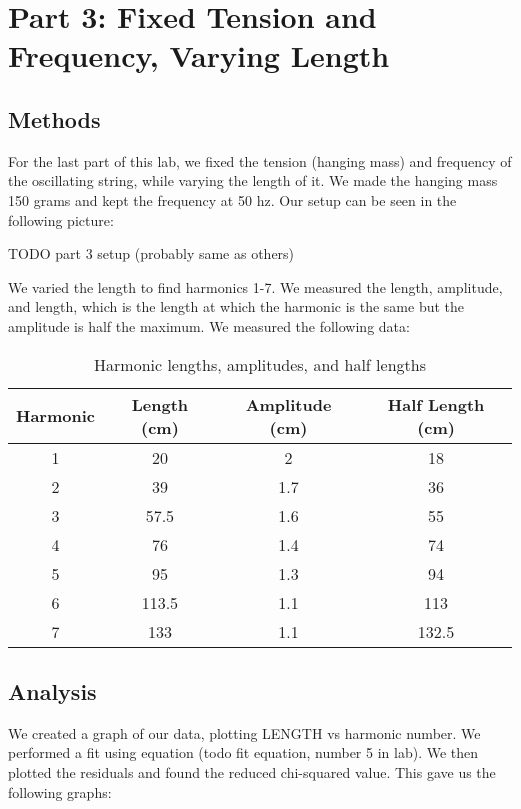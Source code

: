 \documentclass[11pt]{article}
\let\oldsection\section
\renewcommand\section{\clearpage\oldsection}
\begin{document}
    \section{Part 3: Fixed Tension and Frequency, Varying Length}\label{sec:part_3}
    \subsection{Methods}\label{subsec:part_3_methods}
    For the last part of this lab, we fixed the tension (hanging mass) and frequency of the oscillating string, while varying the length of it. We made the hanging mass 150 grams and kept the frequency at 50 hz. Our setup can be seen in the following picture:

    TODO part 3 setup (probably same as others)

    We varied the length to find harmonics 1-7. We measured the length, amplitude, and length, which is the length at which the harmonic is the same but the amplitude is half the maximum. We measured the following data:

    \begin{table}[h]
    \centering
    \begin{tabular}{|c|c|c|c|}
    \hline
    \textbf{Harmonic} & \textbf{Length (cm)} & \textbf{Amplitude (cm)} & \textbf{Half Length (cm)} \\
    \hline
    1 & 20 & 2 & 18 \\
    2 & 39 & 1.7 & 36 \\
    3 & 57.5 & 1.6 & 55 \\
    4 & 76 & 1.4 & 74 \\
    5 & 95 & 1.3 & 94 \\
    6 & 113.5 & 1.1 & 113 \\
    7 & 133 & 1.1 & 132.5 \\
    \hline
    \end{tabular}
    \caption{Harmonic lengths, amplitudes, and half lengths}
    \label{tab:harmonic_lengths}
    \end{table}


    \subsection{Analysis}\label{subsec:part_3_analysis}
    We created a graph of our data, plotting LENGTH vs harmonic number. We performed a fit using equation (todo fit equation, number 5 in lab). We then plotted the residuals and found the reduced chi-squared value. This gave us the following graphs:
\end{document}
